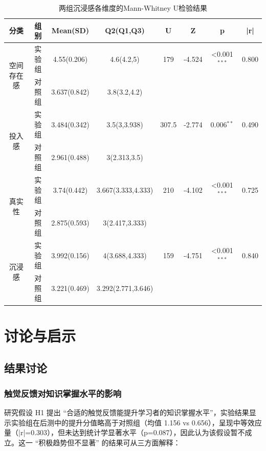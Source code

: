 \documentclass[runningheads]{llncs}
\begin{document}
\begin{table}[t]
\centering
\setlength{\tabcolsep}{2pt} %
\caption{两组沉浸感各维度的Mann-Whitney U检验结果}
\label{tab:immersion}
\begin{tabular}{cccccccc}
\toprule
\textbf{分类} & \textbf{组别} & \textbf{Mean(SD)} & \textbf{Q2(Q1,Q3)} & \textbf{U} & \textbf{Z} & \textbf{p} & \textbf{|r|} \\
\midrule
\multirow{2}{*}{空间存在感} 
& 实验组 & 4.55(0.206) & 4.6(4.2,5) & 179 & -4.524 & <0.001\(^{***}\) & 0.800 \\
& 对照组 & 3.637(0.842) & 3.8(3.2,4.2) &  &  &  &  \\
\multirow{2}{*}{投入感} 
& 实验组 & 3.484(0.342) & 3.5(3,3.938) & 307.5 & -2.774 & 0.006\(^{**}\) & 0.490 \\
& 对照组 & 2.961(0.488) & 3(2.313,3.5) &  &  &  &  \\
\multirow{2}{*}{真实性} 
& 实验组 & 3.74(0.442) & 3.667(3.333,4.333) & 210 & -4.102 & <0.001\(^{***}\) & 0.725 \\
& 对照组 & 2.875(0.593) & 3(2.417,3.333) &  &  &  &  \\
\multirow{2}{*}{沉浸感} 
& 实验组 & 3.992(0.156) & 4(3.688,4.333) & 159 & -4.751 & <0.001\(^{***}\) & 0.840 \\
& 对照组 & 3.221(0.469) & 3.292(2.771,3.646) &  &  &  &  \\
\bottomrule
\end{tabular}
\end{table}

\section{讨论与启示}
\subsection{结果讨论}
\subsubsection{触觉反馈对知识掌握水平的影响} 
研究假设 H1 提出 “合适的触觉反馈能提升学习者的知识掌握水平”，实验结果显示实验组在后测中的提升分值略高于对照组（均值 1.156 vs 0.656），呈现中等效应量（|r|=0.303），但未达到统计学显著水平（p=0.087），因此认为该假设暂不成立。这一 “积极趋势但不显著” 的结果可从三方面解释：
\end{document}
